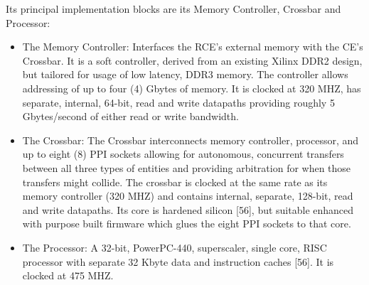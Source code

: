Its principal implementation blocks are its Memory Controller, Crossbar and Processor:
\begin{itemize}
\item The Memory Controller: Interfaces the RCE's external 
memory with the CE's Crossbar. 
It is a soft controller, derived from an existing Xilinx DDR2 design, 
but tailored for usage of low latency, DDR3 memory. 
The controller allows addressing of up to four (4) Gbytes of memory. 
It is clocked at 320 MHZ, has separate, internal, 
64-bit, read and write datapaths providing roughly 
5 Gbytes/second of either read or write bandwidth.
\item The Crossbar: The Crossbar interconnects memory controller, 
processor, and up to eight (8) PPI sockets allowing for autonomous, 
concurrent transfers between all three types of entities and providing 
arbitration for when those transfers might collide. 
The crossbar is clocked at the same rate as its memory controller 
(320 MHZ) and contains internal, separate, 128-bit, read and 
write datapaths. 
Its core is hardened silicon [56], but suitable 
enhanced with purpose built firmware which glues the eight PPI sockets to that core.
\item The Processor: A 32-bit, 
PowerPC-440, superscaler, single core, RISC processor
 with separate 32 Kbyte data and instruction caches [56]. It is clocked at 475 MHZ. 
\end{itemize}

